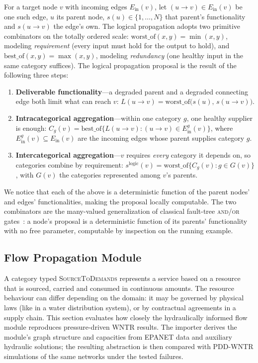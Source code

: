 \documentclass{svproc}
\newcommand{\worstof}{\mathrm{worst\_of}}
\newcommand{\bestof}{\mathrm{best\_of}}
\begin{document}
  For a target node $v$ with incoming edges $E_{\mathrm{in}}(v)$, let $(u\!\to\!v)\in E_{\mathrm{in}}(v)$ be one such
  edge, $u$ its parent node, $s(u)\in\{1,\ldots,N\}$ that parent's functionality and
  $s(u\!\to\!v)$ the edge's own. The logical propagation adopts two primitive combinators
  on the totally ordered scale: $\worstof(x,y)=\min(x,y)$, modeling \emph{requirement}
  (every input must hold for the output to hold), and $\bestof(x,y)=\max(x,y)$, modeling
  \emph{redundancy} (one healthy input in the same category suffices). The logical propagation proposal
  is the result of the following three steps:
  \begin{enumerate}
    \item \textbf{Deliverable functionality}---a degraded parent and a
      degraded connecting edge both limit what can reach $v$:
      $L(u\!\to\!v)=\worstof\big(s(u),\,s(u\!\to\!v)\big)$.
    \item \textbf{Intracategorical aggregation}---within one category $g$,
      one healthy supplier is enough:
      $C_g(v)=\bestof\big\{L(u\!\to\!v):(u\!\to\!v)\in E_{\mathrm{in}}^g(v)\big\}$, 
      where $E_{\mathrm{in}}^g(v)\subseteq E_{\mathrm{in}}(v)$ are the incoming edges whose parent supplies category $g$.
    \item \textbf{Intercategorical aggregation}---$v$ requires \emph{every}
      category it depends on, so categories combine by requirement:
      $s^{\mathrm{logic}}(v)=\worstof\big\{C_g(v):g\in G(v)\big\}$, with $G(v)$ the
      categories represented among $v$'s parents.
  \end{enumerate}
  We notice that each of the above is a deterministic function of the parent nodes'
  and edges' functionalities, making the proposal locally computable.
  The two combinators are the many-valued generalization of classical fault-tree
  \textsc{and}/\textsc{or} gates~\cite{vesely1981fault}: a node's proposal is a
  deterministic function of its parents' functionality with no free parameter, computable
  by inspection on the running example.

  \subsection{Flow Propagation Module}\label{sec:arch-flow}

  A category typed \textsc{SourceToDemands} represents a service based on a resource that is sourced, carried and
  consumed in continuous amounts. The resource behaviour can differ depending on the domain: it may be governed by physical laws (like in a water distribution system),
  or by contractual agreements in a supply chain.
  This section evaluates how closely the hydraulically informed flow module reproduces pressure-driven WNTR 
  results. The importer derives the module's graph structure and capacities from EPANET 
  data and auxiliary hydraulic solutions; the resulting abstraction is then compared with PDD-WNTR 
  simulations of the same networks under the tested failures.
\end{document}
